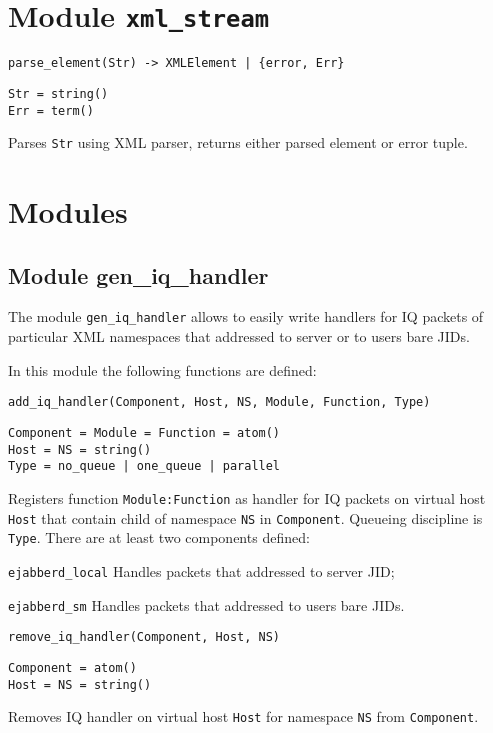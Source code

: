 \documentclass[a4paper,10pt]{article}
\begin{document}
\section{Module \texttt{xml\_stream}}
\label{xmlstreammod}

\begin{description}
\item{\verb!parse_element(Str) -> XMLElement | {error, Err}!}
\begin{verbatim}
Str = string()
Err = term()
\end{verbatim}
  Parses \texttt{Str} using XML parser, returns either parsed element or error
  tuple.
\end{description}


\section{Modules}
\label{emods}




\subsection{Module gen\_iq\_handler}
\label{geniqhandl}

The module \verb|gen_iq_handler| allows to easily write handlers for IQ packets
of particular XML namespaces that addressed to server or to users bare JIDs.

In this module the following functions are defined:
\begin{description}
\item{\verb|add_iq_handler(Component, Host, NS, Module, Function, Type)|}
\begin{verbatim}
Component = Module = Function = atom()
Host = NS = string()
Type = no_queue | one_queue | parallel
\end{verbatim}
  Registers function \verb|Module:Function| as handler for IQ packets on
  virtual host \verb|Host| that contain child of namespace \verb|NS| in
  \verb|Component|.  Queueing discipline is \verb|Type|.  There are at least
  two components defined:
  \begin{description}
  \item{\verb|ejabberd_local|} Handles packets that addressed to server JID;
  \item{\verb|ejabberd_sm|} Handles packets that addressed to users bare JIDs.
  \end{description}
\item{\verb|remove_iq_handler(Component, Host, NS)|}
\begin{verbatim}
Component = atom()
Host = NS = string()
\end{verbatim}
  Removes IQ handler on virtual host \verb|Host| for namespace \verb|NS| from
  \verb|Component|.
\end{description}
\end{document}
